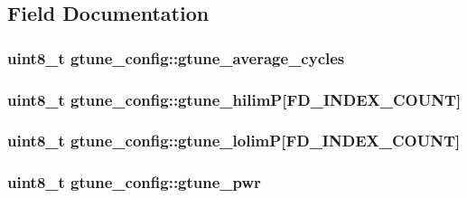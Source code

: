 \subsection{Field Documentation}
\hypertarget{structgtune__config_afcec62f1ae317dbfdcd5421067ed5e68}{
\subsubsection[{gtune\+\_\+average\+\_\+cycles}]{\setlength{\rightskip}{0pt plus 5cm}uint8\+\_\+t gtune\+\_\+config\+::gtune\+\_\+average\+\_\+cycles}}\label{structgtune__config_afcec62f1ae317dbfdcd5421067ed5e68}
\hypertarget{structgtune__config_a054dc199c537327b017e2770e945600e}{
\subsubsection[{gtune\+\_\+hilim\+P}]{\setlength{\rightskip}{0pt plus 5cm}uint8\+\_\+t gtune\+\_\+config\+::gtune\+\_\+hilim\+P\mbox{[}{\bf F\+D\+\_\+\+I\+N\+D\+E\+X\+\_\+\+C\+O\+U\+N\+T}\mbox{]}}}\label{structgtune__config_a054dc199c537327b017e2770e945600e}
\hypertarget{structgtune__config_a4230665105ae8ae6059e4a276674d71f}{
\subsubsection[{gtune\+\_\+lolim\+P}]{\setlength{\rightskip}{0pt plus 5cm}uint8\+\_\+t gtune\+\_\+config\+::gtune\+\_\+lolim\+P\mbox{[}{\bf F\+D\+\_\+\+I\+N\+D\+E\+X\+\_\+\+C\+O\+U\+N\+T}\mbox{]}}}\label{structgtune__config_a4230665105ae8ae6059e4a276674d71f}
\hypertarget{structgtune__config_ab1100384096858284c1740cbbc0f4050}{
\subsubsection[{gtune\+\_\+pwr}]{\setlength{\rightskip}{0pt plus 5cm}uint8\+\_\+t gtune\+\_\+config\+::gtune\+\_\+pwr}}\label{structgtune__config_ab1100384096858284c1740cbbc0f4050}
